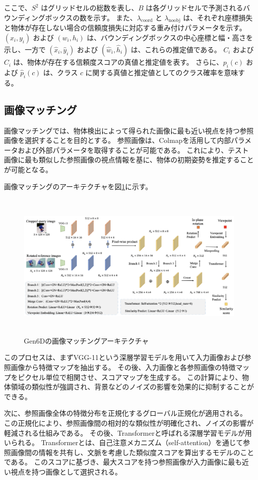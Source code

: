 ここで、$S^2$ はグリッドセルの総数を表し、$B$ は各グリッドセルで予測されるバウンディングボックスの数を示す。
また、$\lambda_{\text{coord}}$ と $\lambda_{\text{noobj}}$ は、それぞれ座標損失と物体が存在しない場合の信頼度損失に対応する重み付けパラメータを示す。
$(x_i, y_i)$ および $(w_i, h_i)$ は、バウンディングボックスの中心座標と幅・高さを示し、一方で $(\hat{x}_i, \hat{y}_i)$ および $(\hat{w}_i, \hat{h}_i)$ は、これらの推定値である。
$C_i$ および $\hat{C}_i$ は、物体が存在する信頼度スコアの真値と推定値を表す。
さらに、$p_i(c)$ および $\hat{p}_i(c)$ は、クラス $c$ に関する真値と推定値としてのクラス確率を意味する。


\subsection{画像マッチング}
画像マッチングでは、物体検出によって得られた画像に最も近い視点を持つ参照画像を選択することを目的とする。
参照画像は、Colmapを活用して内部パラメータおよび外部パラメータを取得することが可能である。
これにより、テスト画像に最も類似した参照画像の視点情報を基に、物体の初期姿勢を推定することが可能となる。

画像マッチングのアーキテクチャを図\ref{fig:f5}に示す。
\begin{figure}[htbt]
	\centering
	 \includegraphics[height=72mm]{Figure/selector_arc.eps}
	 \caption{Gen6Dの画像マッチングアーキテクチャ}
	 \label{fig:f5}
\end{figure}

このプロセスは、まずVGG-11という深層学習モデルを用いて入力画像および参照画像から特徴マップを抽出する。
その後、入力画像と各参照画像の特徴マップをピクセル単位で相関させ、スコアマップを生成する。
この計算により、物体領域の類似性が強調され、背景などのノイズの影響を効果的に抑制することができる。

次に、参照画像全体の特徴分布を正規化するグローバル正規化が適用される。
この正規化により、参照画像間の相対的な類似性が明確化され、ノイズの影響が軽減される仕組みである。
その後、Transformerと呼ばれる深層学習モデルが用いられる。
Transformerとは、自己注意メカニズム（self-attention）を通じて参照画像間の情報を共有し、文脈を考慮した類似度スコアを算出するモデルのことである。
このスコアに基づき、最大スコアを持つ参照画像が入力画像に最も近い視点を持つ画像として選択される。

